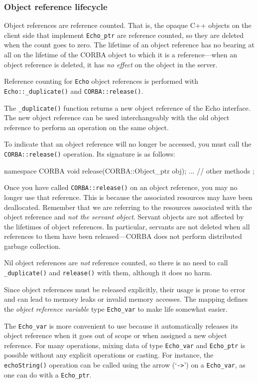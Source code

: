 \documentclass[11pt,oneside,a4paper]{book}
\newcommand{\type}[1]{\texttt{#1}}
\newcommand{\code}[1]{\texttt{#1}}
\newcommand{\op}[1]{\texttt{#1()}}
\newcommand{\term}[1]{\textit{#1}}
\newcommand{\dsc}{\discretionary{}{}{}}
\begin{document}
\subsubsection{Object reference lifecycle}

Object references are reference counted. That is, the opaque C++
objects on the client side that implement \type{Echo\_ptr} are
reference counted, so they are deleted when the count goes to zero.
The lifetime of an object reference has no bearing at all on the
lifetime of the CORBA object to which it is a reference---when an
object reference is deleted, it has \emph{no effect} on the object in
the server.

Reference counting for \type{Echo} object references is performed with
\op{Echo::\dsc{}\_duplicate} and \op{CORBA::release}.

The \op{\_duplicate} function returns a new object reference of the
Echo interface. The new object reference can be used interchangeably
with the old object reference to perform an operation on the same
object.

To indicate that an object reference will no longer be accessed, you
must call the \op{CORBA::release} operation. Its signature is as
follows:

\begin{cxxlisting}
namespace CORBA {
  void release(CORBA::Object_ptr obj);
  ... // other methods
};
\end{cxxlisting}

Once you have called \op{CORBA::release} on an object reference, you
may no longer use that reference. This is because the associated
resources may have been deallocated. Remember that we are referring to
the resources associated with the object reference and \emph{not the
  servant object}. Servant objects are not affected by the lifetimes
of object references. In particular, servants are not deleted when all
references to them have been released---CORBA does not perform
distributed garbage collection.

Nil object references are \emph{not} reference counted, so there is no
need to call \op{\_duplicate} and \op{release} with them, although it
does no harm.

Since object references must be released explicitly, their usage is
prone to error and can lead to memory leaks or invalid memory
accesses. The mapping defines the \term{object reference variable}
type \type{Echo\_var} to make life somewhat easier.

The \type{Echo\_var} is more convenient to use because it
automatically releases its object reference when it goes out of scope
or when assigned a new object reference. For many operations, mixing
data of type \type{Echo\_var} and \type{Echo\_ptr} is possible without
any explicit operations or casting. For instance, the \op{echoString}
operation can be called using the arrow (`\code{->}') on a
\type{Echo\_var}, as one can do with a \type{Echo\_ptr}.
\end{document}
